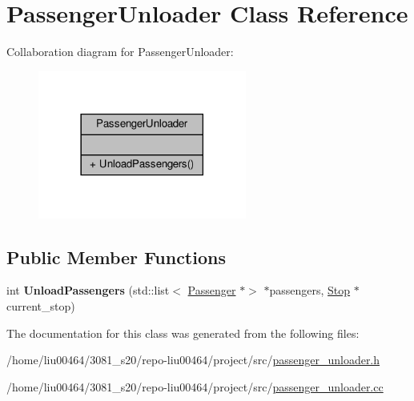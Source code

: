 \hypertarget{classPassengerUnloader}{}\section{Passenger\+Unloader Class Reference}
\label{classPassengerUnloader}


Collaboration diagram for Passenger\+Unloader\+:\nopagebreak
\begin{figure}[H]
\begin{center}
\leavevmode
\includegraphics[width=194pt]{classPassengerUnloader__coll__graph}
\end{center}
\end{figure}
\subsection*{Public Member Functions}
\begin{DoxyCompactItemize}
\item 
\mbox{\label{classPassengerUnloader_a571ee51523a6bce30fb843174eaad4a2}} 
int {\bfseries Unload\+Passengers} (std\+::list$<$ \hyperlink{classPassenger}{Passenger} $\ast$$>$ $\ast$passengers, \hyperlink{classStop}{Stop} $\ast$current\+\_\+stop)
\end{DoxyCompactItemize}


The documentation for this class was generated from the following files\+:\begin{DoxyCompactItemize}
\item 
/home/liu00464/3081\+\_\+s20/repo-\/liu00464/project/src/\hyperlink{passenger__unloader_8h}{passenger\+\_\+unloader.\+h}\item 
/home/liu00464/3081\+\_\+s20/repo-\/liu00464/project/src/\hyperlink{passenger__unloader_8cc}{passenger\+\_\+unloader.\+cc}\end{DoxyCompactItemize}
